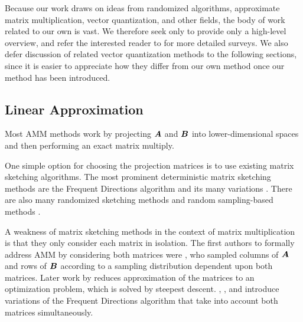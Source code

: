 
Because our work draws on ideas from randomized algorithms, approximate matrix multiplication, vector quantization, and other fields, the body of work related to our own is vast. We therefore seek only to provide only a high-level overview, and refer the interested reader to \cite{learningToHashSurvey, hashingSimilaritySurvey, isvd} for more detailed surveys. We also defer discussion of related vector quantization methods to the following sections, since it is easier to appreciate how they differ from our own method once our method has been introduced.

\subsection{Linear Approximation}

Most AMM methods work by projecting $\bm{A}$ and $\bm{B}$ into lower-dimensional spaces and then performing an exact matrix multiply.

One simple option for choosing the projection matrices is to use existing matrix sketching algorithms. The most prominent deterministic matrix sketching methods are the Frequent Directions algorithm \cite{liberty_simple_2012, ghashami_frequent_2016} and its many variations \cite{teng_fast_2019, francis_practical_2018, ye_frequent_2016, huang_near_2019, luo_robust_2019, francis_improvement_2018}. There are also many randomized sketching methods \cite{sarlos_improved_2006, kyrillidis_approximate_2014, pagh_compressed_2013, hashjl,osnap} and random sampling-based methods \cite{drineas_fast_2006-1, drineas_fast_2006-2}.

A weakness of matrix sketching methods in the context of matrix multiplication is that they only consider each matrix in isolation. The first authors to formally address AMM by considering both matrices were \citet{drineas_fast_2006}, who sampled columns of $\bm{A}$ and rows of $\bm{B}$ according to a sampling distribution dependent upon both matrices. Later work by \citet{manne_fast_2014} reduces approximation of the matrices to an optimization problem, which is solved by steepest descent. \citet{mroueh_co-occuring_2016}, \citet{ye_frequent_2016}, and \citet{francis_improvement_2018} introduce variations of the Frequent Directions algorithm that take into account both matrices simultaneously.


